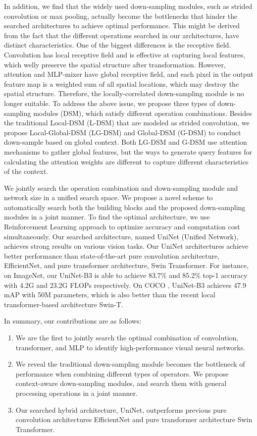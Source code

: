 \documentclass{article} \usepackage{iclr2022_conference,times}
\begin{document}
In addition, we find that the widely used down-sampling modules, such as strided convolution or max pooling, actually become the bottlenecks that hinder the searched architectures to achieve optimal performance. This might be derived from the fact that the different operations searched in our architectures, have distinct characteristics. One of the biggest differences is the receptive field. Convolution has local receptive field and is effective at capturing local features, which welly preserve the spatial structure after transformation. However, attention and MLP-mixer have global receptive field, and each pixel in the output feature map is a weighted sum of all spatial locations, which may destroy the spatial structure. Therefore, the locally-correlated down-sampling module is no longer suitable. To address the above issue, we propose three types of down-sampling modules (DSM), which satisfy different operation combinations. Besides the traditional Local-DSM (L-DSM) that are modeled as strided convolution, we propose Local-Global-DSM (LG-DSM) and Global-DSM (G-DSM) to conduct down-sample based on global context. Both LG-DSM and G-DSM use attention mechanisms to gather global features, but the ways to generate query features for calculating the attention weights are different to capture different characteristics of the context. 

We jointly search the operation combination and down-sampling module and network size in a unified search space. We propose a novel scheme to automatically search both the building blocks and the proposed down-sampling modules in a joint manner. 
To find the optimal architecture, we use Reinforcement Learning approach to optimize accuracy and computation cost simultaneously. Our searched architecture, named UniNet (Unified Network), achieves strong results on various vision tasks. 
Our UniNet architectures achieve better performance than state-of-the-art pure convolution architecture, EfficientNet, and pure transformer architecture, Swin Transformer. 
For instance, on ImageNet, our UniNet-B3 is able to achieve 83.7\% and 85.2\% top-1 accuracy with 4.2G and 23.2G FLOPs respectively.
On COCO \citep{coco}, UniNet-B3 achieves 47.9 mAP with 50M parameters, which is also better than the recent local transformer-based architecture Swin-T.

In summary, our contributions are as follows:
\begin{enumerate}
    \item We are the first to jointly search the optimal combination of convolution, transformer, and MLP to identify high-performance visual neural networks.
    \item We reveal the traditional down-sampling module becomes the bottleneck of performance when combining different types of operators. We propose context-aware down-sampling modules, and search them with general processing operations in a joint manner.
    \item Our searched hybrid architecture, UniNet, outperforms previous pure convolution architectures EfficientNet and pure transformer architecture Swin Transformer.
\end{enumerate}
\end{document}
